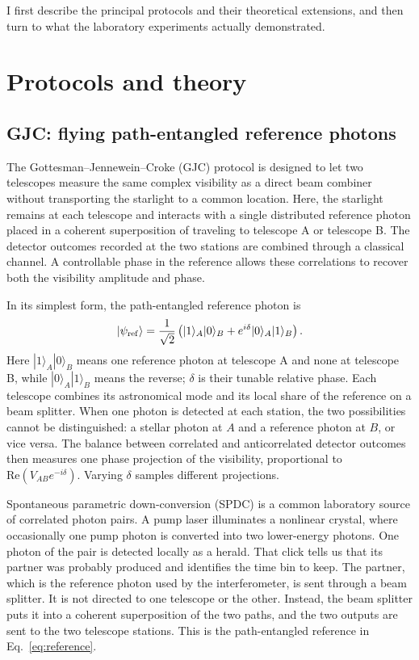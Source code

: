 \documentclass[]{spie}
\begin{document}
I first describe the principal protocols and their theoretical extensions, and then turn to what the laboratory experiments actually demonstrated.

\section{Protocols and theory}
\label{sec:protocols}

\subsection{GJC: flying path-entangled reference photons}

The Gottesman--Jennewein--Croke (GJC) protocol is designed to let two telescopes measure the same complex visibility as a direct beam combiner without transporting the starlight to a common location. Here, the starlight remains at each telescope and interacts with a single distributed reference photon placed in a coherent superposition of traveling to telescope A or telescope B. The detector outcomes recorded at the two stations are combined through a classical channel. A controllable phase in the reference allows these correlations to recover both the visibility amplitude and phase.\cite{Gottesman2012}

In its simplest form, the path-entangled reference photon is
\begin{equation}
    |\psi_{\rm ref}\rangle = \frac{1}{\sqrt{2}}
    \left(|1\rangle_A|0\rangle_B + e^{i\delta}|0\rangle_A|1\rangle_B\right).
    \label{eq:reference}
\end{equation}
Here $|1\rangle_A|0\rangle_B$ means one reference photon at telescope A and none at telescope B, while $|0\rangle_A|1\rangle_B$ means the reverse; $\delta$ is their tunable relative phase. Each telescope combines its astronomical mode and its local share of the reference on a beam splitter. When one photon is detected at each station, the two possibilities cannot be distinguished: a stellar photon at $A$ and a reference photon at $B$, or vice versa. The balance between correlated and anticorrelated detector outcomes then measures one phase projection of the visibility, proportional to $\mathrm{Re}(V_{AB}e^{-i\delta})$. Varying $\delta$ samples different projections.

Spontaneous parametric down-conversion (SPDC) is a common laboratory source of correlated photon pairs. A pump laser illuminates a nonlinear crystal, where occasionally one pump photon is converted into two lower-energy photons. One photon of the pair is detected locally as a herald. That click tells us that its partner was probably produced and identifies the time bin to keep. The partner, which is the reference photon used by the interferometer, is sent through a beam splitter. It is not directed to one telescope or the other. Instead, the beam splitter puts it into a coherent superposition of the two paths, and the two outputs are sent to the two telescope stations. This is the path-entangled reference in Eq.~\ref{eq:reference}.
\end{document}
